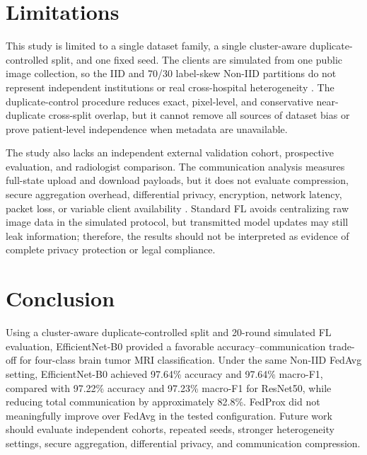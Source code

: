 \documentclass[conference]{IEEEtran}
\begin{document}
\section{Limitations}
This study is limited to a single dataset family, a single cluster-aware duplicate-controlled split, and one fixed seed. The clients are simulated from one public image collection, so the IID and 70/30 label-skew Non-IID partitions do not represent independent institutions or real cross-hospital heterogeneity \cite{naseer2026medfl,xu2023federated}. The duplicate-control procedure reduces exact, pixel-level, and conservative near-duplicate cross-split overlap, but it cannot remove all sources of dataset bias or prove patient-level independence when metadata are unavailable.

The study also lacks an independent external validation cohort, prospective evaluation, and radiologist comparison. The communication analysis measures full-state upload and download payloads, but it does not evaluate compression, secure aggregation overhead, differential privacy, encryption, network latency, packet loss, or variable client availability \cite{rieke2020future,radhika2026communication,aniket2025cfl}. Standard FL avoids centralizing raw image data in the simulated protocol, but transmitted model updates may still leak information; therefore, the results should not be interpreted as evidence of complete privacy protection or legal compliance.

\section{Conclusion}
Using a cluster-aware duplicate-controlled split and 20-round simulated FL evaluation, EfficientNet-B0 provided a favorable accuracy--communication trade-off for four-class brain tumor MRI classification. Under the same Non-IID FedAvg setting, EfficientNet-B0 achieved 97.64\% accuracy and 97.64\% macro-F1, compared with 97.22\% accuracy and 97.23\% macro-F1 for ResNet50, while reducing total communication by approximately 82.8\%. FedProx did not meaningfully improve over FedAvg in the tested configuration. Future work should evaluate independent cohorts, repeated seeds, stronger heterogeneity settings, secure aggregation, differential privacy, and communication compression.



\end{document}
